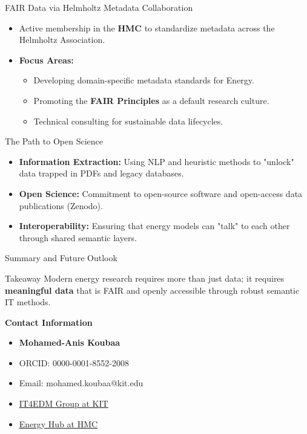\documentclass{beamer}
\begin{document}
\begin{frame}{FAIR Data via Helmholtz Metadata Collaboration}
    \begin{itemize}
        \item Active membership in the \textbf{HMC} to standardize metadata across the Helmholtz Association.
        \item \textbf{Focus Areas:}
            \begin{itemize}
                \item Developing domain-specific metadata standards for Energy.
                \item Promoting the \textbf{FAIR Principles} as a default research culture.
                \item Technical consulting for sustainable data lifecycles.
            \end{itemize}
    \end{itemize}
\end{frame}

\begin{frame}{The Path to Open Science}
    \begin{itemize}
        \item \textbf{Information Extraction:} Using NLP and heuristic methods to "unlock" data trapped in PDFs and legacy databases.
        \item \textbf{Open Science:} Commitment to open-source software and open-access data publications (Zenodo).
        \item \textbf{Interoperability:} Ensuring that energy models can "talk" to each other through shared semantic layers.
    \end{itemize}
\end{frame}

\begin{frame}{Summary and Future Outlook}
    \begin{block}{Takeaway}
        Modern energy research requires more than just data; it requires \textbf{meaningful data} that is FAIR and openly accessible through robust semantic IT methods.
    \end{block}
    
    \vspace{0.8cm}
            \textbf{Contact Information}
            \begin{itemize}
                \item \textbf{Mohamed-Anis Koubaa}
                \item \small{ORCID: 0000-0001-8552-2008}
                \item \small{Email: mohamed.koubaa@kit.edu}
                \item \href{https://www.iai.kit.edu/2154_4201.php}{\color{HMCAccent}\underline{IT4EDM Group at KIT}}
                \item \href{https://helmholtz-metadaten.de/energy/team}{\color{HMCAccent}\underline{Energy Hub at HMC}}
            \end{itemize}

\end{frame}
\end{document}
